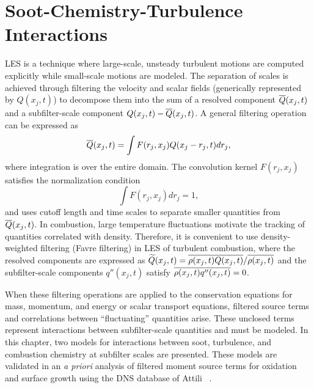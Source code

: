 \chapter{Soot-Chemistry-Turbulence Interactions\label{ch:subfilter}}

LES is a technique where large-scale, unsteady turbulent motions are computed explicitly while small-scale motions are modeled. The separation of scales is achieved through filtering the velocity and scalar fields (generically represented by $Q(x_j,t)$) to decompose them into the sum of a resolved component $\overline{Q}(x_j,t)$ and a subfilter-scale component $Q(x_j,t)-\overline{Q}(x_j,t)$. A general filtering operation can be expressed as
\begin{equation}\label{eq:subfilter:filter}
  \overline{Q}(x_j,t) = \int F(r_j,x_j)Q(x_j - r_j, t)dr_j,
\end{equation}
where integration is over the entire domain. The convolution kernel $F(r_j,x_j)$ satisfies the normalization condition
\begin{equation}\label{eq:subfilter:kernel}
  \int F(r_j,x_j)dr_j = 1,
\end{equation}
and uses cutoff length and time scales to separate smaller quantities from $\overline{Q}(x_j,t)$. In combustion, large temperature fluctuations motivate the tracking of quantities correlated with density. Therefore, it is convenient to use density-weighted filtering (Favre filtering) in LES of turbulent combustion, where the resolved components are expressed as $\widetilde{Q}(x_j,t) = \overline{\rho(x_j,t)Q(x_j,t)}/\overline{\rho(x_j,t)}$ and the subfilter-scale components $q''(x_j,t)$ satisfy $\overline{\rho(x_j,t) q''(x_j,t)} = 0$.

When these filtering operations are applied to the conservation equations for mass, momentum, and energy or scalar transport equations, filtered source terms and correlations between ``fluctuating'' quantities arise. These unclosed terms represent interactions between subfilter-scale quantities and must be modeled. In this chapter, two models for interactions between soot, turbulence, and combustion chemistry at subfilter scales are presented. These models are validated in an \textit{a priori} analysis of filtered moment source terms for oxidation and surface growth using the DNS database of Attili \etal~\cite{attili2014}.






